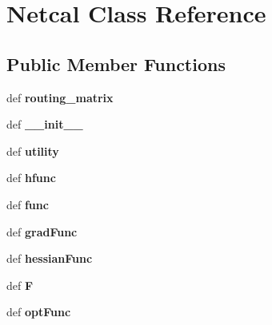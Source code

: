 \hypertarget{class_1_1Netcal}{
\section{Netcal Class Reference}
\label{class_1_1Netcal}
}
\subsection*{Public Member Functions}
\begin{DoxyCompactItemize}
\item 
\hypertarget{class_1_1Netcal_a08e8cf5238d3e9faba0467d549224461}{
def {\bfseries routing\_\-matrix}}
\label{class_1_1Netcal_a08e8cf5238d3e9faba0467d549224461}

\item 
\hypertarget{class_1_1Netcal_abfc6052e7b3097ca7ed268917c3fafea}{
def {\bfseries \_\-\_\-init\_\-\_\-}}
\label{class_1_1Netcal_abfc6052e7b3097ca7ed268917c3fafea}

\item 
\hypertarget{class_1_1Netcal_ae3091ee56c59cf5c31ba6455b0f585e8}{
def {\bfseries utility}}
\label{class_1_1Netcal_ae3091ee56c59cf5c31ba6455b0f585e8}

\item 
\hypertarget{class_1_1Netcal_a1d0f966c28ad73c3fab983b287ed3b5f}{
def {\bfseries hfunc}}
\label{class_1_1Netcal_a1d0f966c28ad73c3fab983b287ed3b5f}

\item 
\hypertarget{class_1_1Netcal_afe6167efd29ce47ed7623d8538700243}{
def {\bfseries func}}
\label{class_1_1Netcal_afe6167efd29ce47ed7623d8538700243}

\item 
\hypertarget{class_1_1Netcal_add6dd20c391d7f59453424f0cf8f62fc}{
def {\bfseries gradFunc}}
\label{class_1_1Netcal_add6dd20c391d7f59453424f0cf8f62fc}

\item 
\hypertarget{class_1_1Netcal_a7680dc451c929d183063cc67613a1029}{
def {\bfseries hessianFunc}}
\label{class_1_1Netcal_a7680dc451c929d183063cc67613a1029}

\item 
\hypertarget{class_1_1Netcal_a975096014e9ea39f545041088fb581ee}{
def {\bfseries F}}
\label{class_1_1Netcal_a975096014e9ea39f545041088fb581ee}

\item 
\hypertarget{class_1_1Netcal_a52748b658e5a6524aa97e1fe7e532147}{
def {\bfseries optFunc}}
\label{class_1_1Netcal_a52748b658e5a6524aa97e1fe7e532147}

\end{DoxyCompactItemize}
